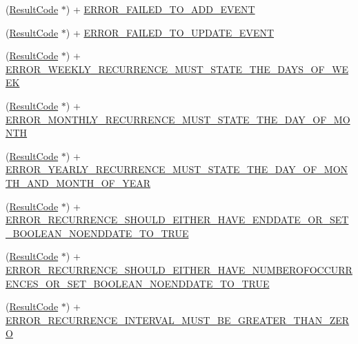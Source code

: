 \begin{DoxyCompactItemize}
(\hyperlink{interface_result_code}{Result\+Code} $\ast$) + \hyperlink{interface_result_code_ad68f2f85551ff576f604a3b17573ea09}{E\+R\+R\+O\+R\+\_\+\+F\+A\+I\+L\+E\+D\+\_\+\+T\+O\+\_\+\+A\+D\+D\+\_\+\+E\+V\+E\+N\+T}
\item 
(\hyperlink{interface_result_code}{Result\+Code} $\ast$) + \hyperlink{interface_result_code_a0a38dfa96621aa68ac3f75662cbf4c3c}{E\+R\+R\+O\+R\+\_\+\+F\+A\+I\+L\+E\+D\+\_\+\+T\+O\+\_\+\+U\+P\+D\+A\+T\+E\+\_\+\+E\+V\+E\+N\+T}
\item 
(\hyperlink{interface_result_code}{Result\+Code} $\ast$) + \hyperlink{interface_result_code_a5841c24d1de493d557a34973cb6fffea}{E\+R\+R\+O\+R\+\_\+\+W\+E\+E\+K\+L\+Y\+\_\+\+R\+E\+C\+U\+R\+R\+E\+N\+C\+E\+\_\+\+M\+U\+S\+T\+\_\+\+S\+T\+A\+T\+E\+\_\+\+T\+H\+E\+\_\+\+D\+A\+Y\+S\+\_\+\+O\+F\+\_\+\+W\+E\+E\+K}
\item 
(\hyperlink{interface_result_code}{Result\+Code} $\ast$) + \hyperlink{interface_result_code_a62af65d3a665d3cc7a86b7529741c0e7}{E\+R\+R\+O\+R\+\_\+\+M\+O\+N\+T\+H\+L\+Y\+\_\+\+R\+E\+C\+U\+R\+R\+E\+N\+C\+E\+\_\+\+M\+U\+S\+T\+\_\+\+S\+T\+A\+T\+E\+\_\+\+T\+H\+E\+\_\+\+D\+A\+Y\+\_\+\+O\+F\+\_\+\+M\+O\+N\+T\+H}
\item 
(\hyperlink{interface_result_code}{Result\+Code} $\ast$) + \hyperlink{interface_result_code_af2685433dc88dea5d3646a692f07fbf6}{E\+R\+R\+O\+R\+\_\+\+Y\+E\+A\+R\+L\+Y\+\_\+\+R\+E\+C\+U\+R\+R\+E\+N\+C\+E\+\_\+\+M\+U\+S\+T\+\_\+\+S\+T\+A\+T\+E\+\_\+\+T\+H\+E\+\_\+\+D\+A\+Y\+\_\+\+O\+F\+\_\+\+M\+O\+N\+T\+H\+\_\+\+A\+N\+D\+\_\+\+M\+O\+N\+T\+H\+\_\+\+O\+F\+\_\+\+Y\+E\+A\+R}
\item 
(\hyperlink{interface_result_code}{Result\+Code} $\ast$) + \hyperlink{interface_result_code_a414daa35dc5c638231b4bd91626a87e2}{E\+R\+R\+O\+R\+\_\+\+R\+E\+C\+U\+R\+R\+E\+N\+C\+E\+\_\+\+S\+H\+O\+U\+L\+D\+\_\+\+E\+I\+T\+H\+E\+R\+\_\+\+H\+A\+V\+E\+\_\+\+E\+N\+D\+D\+A\+T\+E\+\_\+\+O\+R\+\_\+\+S\+E\+T\+\_\+\+B\+O\+O\+L\+E\+A\+N\+\_\+\+N\+O\+E\+N\+D\+D\+A\+T\+E\+\_\+\+T\+O\+\_\+\+T\+R\+U\+E}
\item 
(\hyperlink{interface_result_code}{Result\+Code} $\ast$) + \hyperlink{interface_result_code_a75723fae5c1d8386217e9b7c08e46b79}{E\+R\+R\+O\+R\+\_\+\+R\+E\+C\+U\+R\+R\+E\+N\+C\+E\+\_\+\+S\+H\+O\+U\+L\+D\+\_\+\+E\+I\+T\+H\+E\+R\+\_\+\+H\+A\+V\+E\+\_\+\+N\+U\+M\+B\+E\+R\+O\+F\+O\+C\+C\+U\+R\+R\+E\+N\+C\+E\+S\+\_\+\+O\+R\+\_\+\+S\+E\+T\+\_\+\+B\+O\+O\+L\+E\+A\+N\+\_\+\+N\+O\+E\+N\+D\+D\+A\+T\+E\+\_\+\+T\+O\+\_\+\+T\+R\+U\+E}
\item 
(\hyperlink{interface_result_code}{Result\+Code} $\ast$) + \hyperlink{interface_result_code_ae9fb956fce8379c1c432b054e6776f23}{E\+R\+R\+O\+R\+\_\+\+R\+E\+C\+U\+R\+R\+E\+N\+C\+E\+\_\+\+I\+N\+T\+E\+R\+V\+A\+L\+\_\+\+M\+U\+S\+T\+\_\+\+B\+E\+\_\+\+G\+R\+E\+A\+T\+E\+R\+\_\+\+T\+H\+A\+N\+\_\+\+Z\+E\+R\+O}

\end{DoxyCompactItemize}
